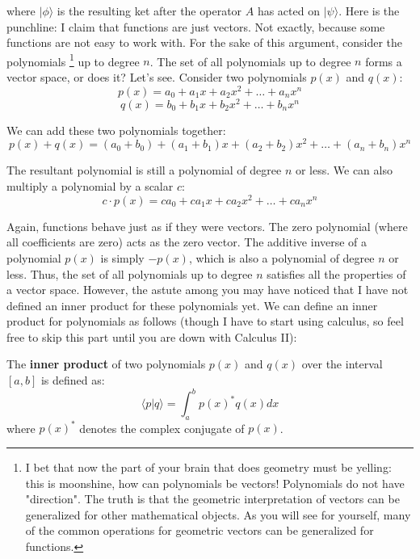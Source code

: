 where \(|\phi\rangle\) is the resulting ket after the operator \(A\) has acted on \(|\psi\rangle\). Here is the punchline: I claim that functions are just vectors. Not exactly, because some functions are not easy to work with. For the sake of this argument, consider the polynomials \footnote{I bet that now the part of your brain that does geometry must be yelling: this is moonshine, how can polynomials be vectors! Polynomials do not have "direction". The truth is that the geometric interpretation of vectors can be generalized for other mathematical objects. As you will see for yourself, many of the common operations for geometric vectors can be generalized for functions.} up to degree \(n\). The set of all polynomials up to degree \(n\) forms a vector space, or does it? Let's see. Consider two polynomials \(p(x)\) and \(q(x)\):
\begin{equation*}
  p(x) = a_0 + a_1 x + a_2 x^2 + \ldots + a_n x^n
\end{equation*}
\begin{equation*}
  q(x) = b_0 + b_1 x + b_2 x^2 + \ldots + b_n x^n
\end{equation*}


We can add these two polynomials together:
\begin{equation*}
  p(x) + q(x) = (a_0 + b_0) +
  (a_1 + b_1)x + (a_2 + b_2)x^2 + \ldots + (a_n + b_n)x^n
\end{equation*}


The resultant polynomial is still a polynomial of degree \(n\) or less. We can also multiply a polynomial by a scalar \(c\):
\begin{equation*}
  c \cdot p(x) = c a_0 + c a_1 x + c a_2 x^2 + \ldots + c a_n x^n
\end{equation*}


Again, functions behave just as if they were vectors. The zero polynomial (where all coefficients are zero) acts as the zero vector. The additive inverse of a polynomial \(p(x)\) is simply \(-p(x)\), which is also a polynomial of degree \(n\) or less. Thus, the set of all polynomials up to degree \(n\) satisfies all the properties of a vector space. However, the astute among you may have noticed that I have not defined an inner product for these polynomials yet. We can define an inner product for polynomials as follows (though I have to start using calculus, so feel free to skip this part until you are down with Calculus II):
\begin{definition}
  The \textbf{inner product} of two polynomials \(p(x)\) and \(q(x)\) over the interval \([a, b]\) is defined as:
  \begin{equation*}
    \langle p | q \rangle = \int_a^b p(x)^* q(x) dx
  \end{equation*}
  where \(p(x)^*\) denotes the complex conjugate of \(p(x)\).
\end{definition}



